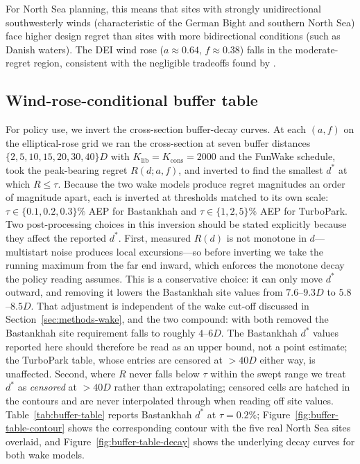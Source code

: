 \documentclass[wes, manuscript]{copernicus}
\begin{document}
For North Sea planning, this means that sites with strongly unidirectional southwesterly winds (characteristic of the German Bight and southern North Sea) face higher design regret than sites with more bidirectional conditions (such as Danish waters).
The DEI wind rose ($a \approx 0.64$, $f \approx 0.38$) falls in the moderate-regret region, consistent with the negligible tradeoffs found by \citet{Quick2026omae}.

\subsection{Wind-rose-conditional buffer table}\label{sec:buffer-table}

For policy use, we invert the cross-section buffer-decay curves.
At each $(a, f)$ on the elliptical-rose grid we ran the cross-section at seven buffer distances $\{2, 5, 10, 15, 20, 30, 40\}D$ with $K_\text{lib} = K_\text{cons} = 2000$ and the FunWake schedule, took the peak-bearing regret $R(d; a, f)$, and inverted to find the smallest $d^*$ at which $R \leq \tau$.
Because the two wake models produce regret magnitudes an order of magnitude apart, each is inverted at thresholds matched to its own scale: $\tau \in \{0.1, 0.2, 0.3\}\%$ AEP for Bastankhah and $\tau \in \{1, 2, 5\}\%$ AEP for TurboPark.
Two post-processing choices in this inversion should be stated explicitly because they affect the reported $d^*$.
First, measured $R(d)$ is not monotone in $d$---multistart noise produces local excursions---so before inverting we take the running maximum from the far end inward, which enforces the monotone decay the policy reading assumes.
This is a conservative choice: it can only move $d^*$ outward, and removing it lowers the Bastankhah site values from $7.6$--$9.3D$ to $5.8$--$8.5D$. That adjustment is independent of the wake cut-off discussed in Section~\ref{sec:methods-wake}, and the two compound: with both removed the Bastankhah site requirement falls to roughly $4$--$6D$. The Bastankhah $d^*$ values reported here should therefore be read as an upper bound, not a point estimate; the TurboPark table, whose entries are censored at $>40D$ either way, is unaffected.
Second, where $R$ never falls below $\tau$ within the swept range we treat $d^*$ as \emph{censored} at $>40D$ rather than extrapolating; censored cells are hatched in the contours and are never interpolated through when reading off site values.
Table~\ref{tab:buffer-table} reports Bastankhah $d^*$ at $\tau = 0.2\%$; Figure~\ref{fig:buffer-table-contour} shows the corresponding contour with the five real North Sea sites overlaid, and Figure~\ref{fig:buffer-table-decay} shows the underlying decay curves for both wake models.
\end{document}
